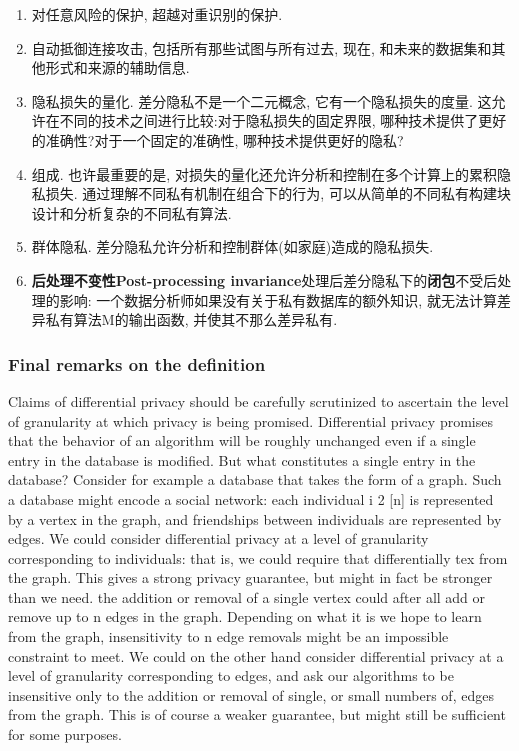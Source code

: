 \begin{enumerate}
    \item 对任意风险的保护, 超越对重识别的保护. 
    \item  自动抵御连接攻击, 包括所有那些试图与所有过去, 现在, 和未来的数据集和其他形式和来源的辅助信息. 
    \item  隐私损失的量化. 差分隐私不是一个二元概念, 它有一个隐私损失的度量. 这允许在不同的技术之间进行比较:对于隐私损失的固定界限, 哪种技术提供了更好的准确性?对于一个固定的准确性, 哪种技术提供更好的隐私?
    \item  组成. 也许最重要的是, 对损失的量化还允许分析和控制在多个计算上的累积隐私损失. 通过理解不同私有机制在组合下的行为, 可以从简单的不同私有构建块设计和分析复杂的不同私有算法. 
\item  群体隐私. 差分隐私允许分析和控制群体(如家庭)造成的隐私损失. 
\item  \textbf{后处理不变性Post-processing invariance}处理后差分隐私下的\textbf{闭包}不受后处理的影响: 一个数据分析师如果没有关于私有数据库的额外知识, 就无法计算差异私有算法M的输出函数, 并使其不那么差异私有. 
\end{enumerate}
 
 
 
\subsubsection{Final remarks on the definition}

 Claims of differential privacy should be carefully scrutinized to ascertain the level of granularity at which privacy is being promised. Differential privacy promises that the behavior of an algorithm will be roughly unchanged even if a single entry in the database is modified. But what constitutes a single entry in the database? Consider for example a database that takes the form of a graph. Such a database might encode a social network: each individual i 2 [n] is represented by a vertex in the graph, and friendships between individuals are represented by edges. We could consider differential privacy at a level of granularity corresponding to individuals: that is, we could require that differentially tex from the graph. This gives a strong privacy guarantee, but might in fact be stronger than we need. the addition or removal of a single vertex could after all add or remove up to n edges in the graph. Depending on what it is we hope to learn from the graph, insensitivity to n edge removals might be an impossible constraint to meet. We could on the other hand consider differential privacy at a level of granularity corresponding to edges, and ask our algorithms to be insensitive only to the addition or removal of single, or small numbers of, edges from the graph. This is of course a weaker guarantee, but might still be sufficient for some purposes.
 
